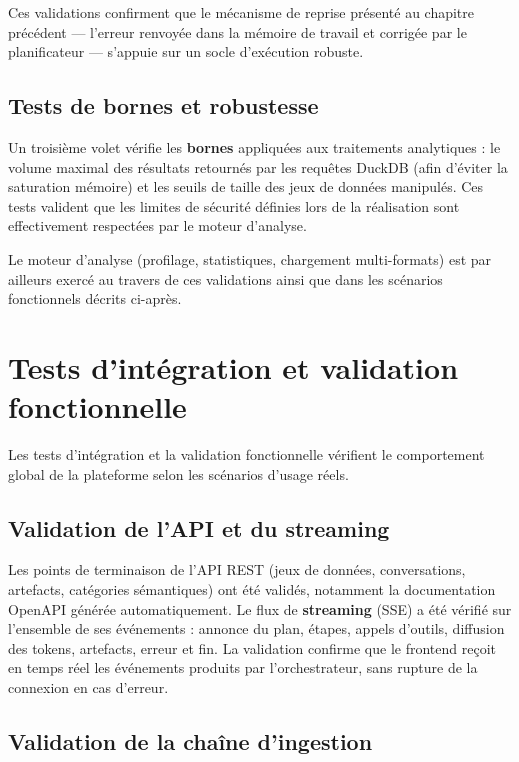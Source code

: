 Ces validations confirment que le mécanisme de reprise présenté au chapitre précédent — l'erreur renvoyée dans la mémoire de travail et corrigée par le planificateur — s'appuie sur un socle d'exécution robuste.

\subsection{Tests de bornes et robustesse}

Un troisième volet vérifie les \textbf{bornes} appliquées aux traitements analytiques : le volume maximal des résultats retournés par les requêtes DuckDB (afin d'éviter la saturation mémoire) et les seuils de taille des jeux de données manipulés. Ces tests valident que les limites de sécurité définies lors de la réalisation sont effectivement respectées par le moteur d'analyse.

Le moteur d'analyse (profilage, statistiques, chargement multi-formats) est par ailleurs exercé au travers de ces validations ainsi que dans les scénarios fonctionnels décrits ci-après.

\section{Tests d'intégration et validation fonctionnelle}

Les tests d'intégration et la validation fonctionnelle vérifient le comportement global de la plateforme selon les scénarios d'usage réels.

\subsection{Validation de l'API et du streaming}

Les points de terminaison de l'API REST (jeux de données, conversations, artefacts, catégories sémantiques) ont été validés, notamment la documentation OpenAPI générée automatiquement. Le flux de \textbf{streaming} (SSE) a été vérifié sur l'ensemble de ses événements : annonce du plan, étapes, appels d'outils, diffusion des tokens, artefacts, erreur et fin. La validation confirme que le frontend reçoit en temps réel les événements produits par l'orchestrateur, sans rupture de la connexion en cas d'erreur.

\subsection{Validation de la chaîne d'ingestion}

